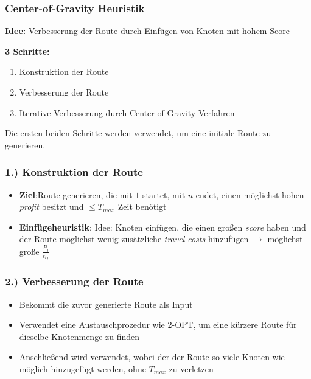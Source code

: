 \documentclass{beamer}
\begin{document}
\begin{frame}
  \frametitle{Center-of-Gravity Heuristik}
  \textbf{Idee:}
  Verbesserung der Route durch Einfügen von Knoten mit hohem Score \

  \textbf{3 Schritte:}
  \begin{enumerate}
    \item Konstruktion der Route
    \item Verbesserung der Route
    \item Iterative Verbesserung durch Center-of-Gravity-Verfahren
  \end{enumerate}
  Die ersten beiden Schritte werden verwendet, um eine initiale Route zu generieren.
\end{frame}

\begin{frame}
  \frametitle{1.) Konstruktion der Route}
  \begin{itemize}
    \item \textbf{Ziel}:\newline Route generieren, die mit $1$ startet, mit $n$ endet, einen möglichst hohen \textit{profit} besitzt
    und $\leq T_{max}$ Zeit benötigt
    \item \textbf{Einfügeheuristik}:\newline
    Idee: Knoten einfügen, die einen großen \textit{score} haben und der Route
    möglichst wenig zusätzliche \textit{travel costs} hinzufügen\newline
    $\rightarrow$ möglichst große $\frac{P_j}{t_{lj}}$
  \end{itemize}
\end{frame}

\begin{frame}
  \frametitle{2.) Verbesserung der Route}
  \begin{itemize}
    \item Bekommt die zuvor generierte Route als Input
    \item Verwendet eine Austauschprozedur wie \textsc{2-OPT}, um eine kürzere Route für dieselbe Knotenmenge zu finden
    \item Anschließend wird  verwendet, wobei der der Route so viele Knoten wie möglich hinzugefügt werden,
    ohne $T_{max}$ zu verletzen
  \end{itemize}
\end{frame}
\end{document}
